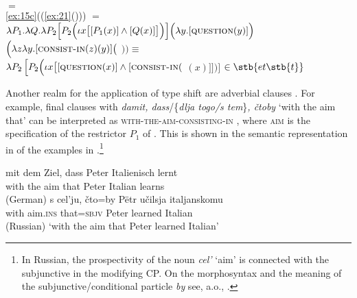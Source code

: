 \documentclass[output=paper,
colorlinks,
citecolor=brown,
newtxmath
]{langscibook}
\begin{document}
    \begin{doublespace} %

\ea\label{ex:22}  $=$ \\
\ref{ex:15c}\Big(\big(\ref{ex:21}()\big)\Big) $=$ \\
$\lambda P_{1} . \lambda Q . \lambda P_{2} \Big[P_{2} \Big(\iota x \big[[P_{1} (x)] \wedge [Q (x)]\big]\Big)\Big] \Big(\lambda y. [\textsc{question} (y)]\Big)
$\newline$\Big(\lambda z \lambda y. [\textsc{consist-in} (z) (y)] \big($  $\big)\Big) \equiv$\\
$\lambda P_{2} \, \Big[P_{2}\Big(\iota x \big[[\textsc{question} (x)] \wedge [\textsc{consist-in} ($ $(x)]\big]\Big)\Big]$ $\in \stb{et\stb{t}}$
\z

    \end{doublespace}

\noindent Another realm for the application of type shift  are adverbial clauses \citep{Zimmermann2018a,Zimmermann2019c,Zimmermann2019b}. For example, final clauses with \textit{damit, dass}/\{\textit{dlja togo/s tem}\}\textit{, čtoby} `with the aim that' can be interpreted as \textsc{with-the-aim-consisting-in} , where \textsc{aim} is the specification of the restrictor $P_1$ of . This is shown in the semantic representation in  of the examples in .\footnote{In Russian, the prospectivity of the noun \textit{cel'} `aim' is connected with the subjunctive in the modifying CP. On the morphosyntax and the meaning of the subjunctive/conditional particle \textit{by} see, a.o., \citet{Zimmermann2015}.}

\ea\label{ex:23}
    \ea\label{ex:23a} \gll mit dem Ziel, dass Peter Italienisch lernt\\
    with the aim that Peter Italian learns \\ \hfill (German)
    \ex\label{ex:23b} \gll s cel'ju, čto=by Pëtr učilsja italjanskomu\\
    with aim.\textsc{ins} that=\textsc{sbjv} Peter learned Italian \\ \hfill (Russian)
    \z
    \glt `with the aim that Peter learned Italian'
\z
\end{document}
